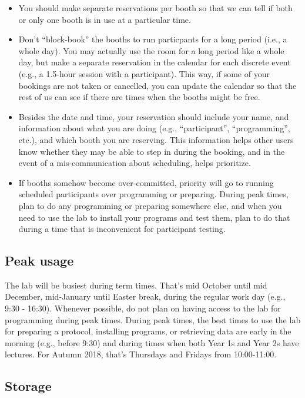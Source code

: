 \documentclass[12pt,]{book}
\theoremstyle{definition}
\theoremstyle{definition}
\theoremstyle{definition}
\theoremstyle{remark}
\begin{document}
\begin{itemize}
\item
  You should make separate reservations per booth so that we can tell if
  both or only one booth is in use at a particular time.
\item
  Don't ``block-book'' the booths to run particpants for a long period
  (i.e., a whole day). You may actually use the room for a long period
  like a whole day, but make a separate reservation in the calendar for
  each discrete event (e.g., a 1.5-hour session with a participant).
  This way, if some of your bookings are not taken or cancelled, you can
  update the calendar so that the rest of us can see if there are times
  when the booths might be free.
\item
  Besides the date and time, your reservation should include your name,
  and information about what you are doing (e.g., ``participant'',
  ``programming'', etc.), and which booth you are reserving. This
  information helps other users know whether they may be able to step in
  during the booking, and in the event of a mis-communication about
  scheduling, helps prioritize.
\item
  If booths somehow become over-committed, priority will go to running
  scheduled participants over programming or preparing. During peak
  times, plan to do any programming or preparing somewhere else, and
  when you need to use the lab to install your programs and test them,
  plan to do that during a time that is inconvenient for participant
  testing.
\end{itemize}

\subsection{Peak usage}\label{peak-usage}

The lab will be busiest during term times. That's mid October until mid
December, mid-January until Easter break, during the regular work day
(e.g., 9:30 - 16:30). Whenever possible, do not plan on having access to
the lab for programming during peak times. During peak times, the best
times to use the lab for preparing a protocol, installing programs, or
retrieving data are early in the morning (e.g., before 9:30) and during
times when both Year 1s and Year 2s have lectures. For Autumn 2018,
that's Thursdays and Fridays from 10:00-11:00.

\subsection{Storage}\label{storage}
\end{document}
